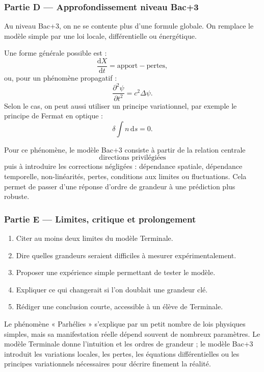 \documentclass[11pt,a4paper]{article}
\begin{document}
\subsubsection*{Partie D — Approfondissement niveau Bac+3}

\begin{approfondissementbox}
Au niveau Bac+3, on ne se contente plus d'une formule globale. On remplace le modèle simple par une loi locale, différentielle ou énergétique.

Une forme générale possible est :
\[
\frac{\mathrm d X}{\mathrm dt}=\text{apport}-\text{pertes},
\]
ou, pour un phénomène propagatif :
\[
\frac{\partial^2 \psi}{\partial t^2}=c^2\Delta\psi.
\]
Selon le cas, on peut aussi utiliser un principe variationnel, par exemple le principe de Fermat en optique :
\[
\delta \int n\,\mathrm ds=0.
\]

Pour ce phénomène, le modèle Bac+3 consiste à partir de la relation centrale
\[
\text{directions privilégiées}
\]
puis à introduire les corrections négligées : dépendance spatiale, dépendance temporelle, non-linéarités, pertes, conditions aux limites ou fluctuations. Cela permet de passer d'une réponse d'ordre de grandeur à une prédiction plus robuste.
\end{approfondissementbox}

\subsubsection*{Partie E — Limites, critique et prolongement}

\begin{enumerate}
  \item Citer au moins deux limites du modèle Terminale.
  \item Dire quelles grandeurs seraient difficiles à mesurer expérimentalement.
  \item Proposer une expérience simple permettant de tester le modèle.
  \item Expliquer ce qui changerait si l'on doublait une grandeur clé.
  \item Rédiger une conclusion courte, accessible à un élève de Terminale.
\end{enumerate}

\begin{corrigebox}
Le phénomène « Parhélies » s'explique par un petit nombre de lois physiques simples, mais sa manifestation réelle dépend souvent de nombreux paramètres. Le modèle Terminale donne l'intuition et les ordres de grandeur ; le modèle Bac+3 introduit les variations locales, les pertes, les équations différentielles ou les principes variationnels nécessaires pour décrire finement la réalité.
\end{corrigebox}
\end{document}
